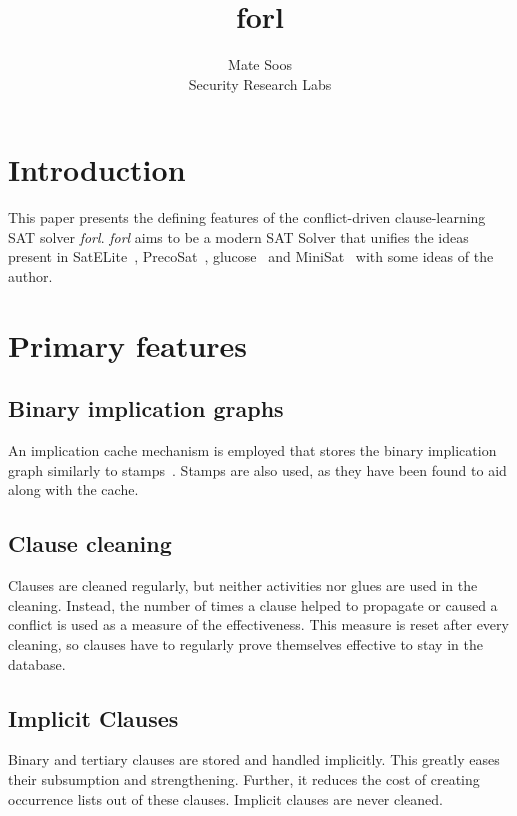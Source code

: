 \documentclass[final]{ieee}
\begin{document}
\title{forl}
\author{Mate Soos\\Security Research Labs}

\maketitle
\thispagestyle{empty}
\pagestyle{empty}

\section{Introduction}
This paper presents the defining features of the conflict-driven clause-learning SAT solver \emph{forl}. \emph{forl} aims to be a modern SAT Solver that unifies the ideas present in SatELite~\cite{DBLP:conf/sat/EenB05}, PrecoSat~\cite{precosat}, glucose~\cite{glucose} and  MiniSat~\cite{EenS03MiniSat} with some ideas of the author.

\section{Primary features}

\subsection{Binary implication graphs}
An implication cache mechanism is employed that stores the binary implication graph similarly to stamps~\cite{DBLP:conf/sat/HeuleJB11}. Stamps are also used, as they have been found to aid along with the cache.

\subsection{Clause cleaning}
Clauses are cleaned regularly, but neither activities nor glues are used in the cleaning. Instead, the number of times a clause helped to propagate or caused a conflict is used as a measure of the effectiveness. This measure is reset after every cleaning, so clauses have to regularly prove themselves effective to stay in the database.

\subsection{Implicit Clauses}
Binary and tertiary clauses are stored and handled implicitly. This greatly eases their subsumption and strengthening. Further, it reduces the cost of creating occurrence lists out of these clauses. Implicit clauses are never cleaned.
\end{document}
